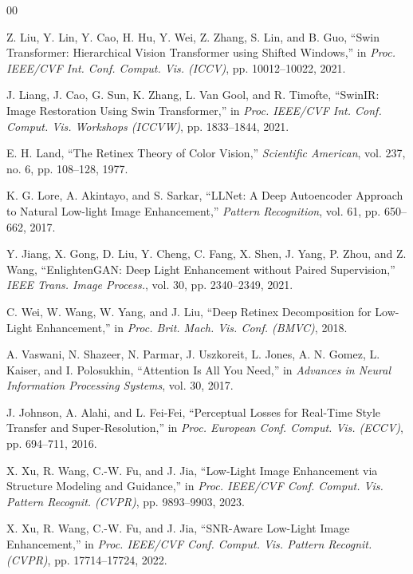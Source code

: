 \documentclass[12pt, a4paper]{report}
\begin{document}
\clearpage
\renewcommand{\bibname}{REFERENCES}
\begin{thebibliography}{00}

Z. Liu, Y. Lin, Y. Cao, H. Hu, Y. Wei, Z. Zhang, S. Lin, and B. Guo, ``Swin Transformer: Hierarchical Vision Transformer using Shifted Windows,'' in \textit{Proc. IEEE/CVF Int. Conf. Comput. Vis. (ICCV)}, pp. 10012--10022, 2021.

J. Liang, J. Cao, G. Sun, K. Zhang, L. Van Gool, and R. Timofte, ``SwinIR: Image Restoration Using Swin Transformer,'' in \textit{Proc. IEEE/CVF Int. Conf. Comput. Vis. Workshops (ICCVW)}, pp. 1833--1844, 2021.

E. H. Land, ``The Retinex Theory of Color Vision,'' \textit{Scientific American}, vol. 237, no. 6, pp. 108--128, 1977.

K. G. Lore, A. Akintayo, and S. Sarkar, ``LLNet: A Deep Autoencoder Approach to Natural Low-light Image Enhancement,'' \textit{Pattern Recognition}, vol. 61, pp. 650--662, 2017.

Y. Jiang, X. Gong, D. Liu, Y. Cheng, C. Fang, X. Shen, J. Yang, P. Zhou, and Z. Wang, ``EnlightenGAN: Deep Light Enhancement without Paired Supervision,'' \textit{IEEE Trans. Image Process.}, vol. 30, pp. 2340--2349, 2021.

C. Wei, W. Wang, W. Yang, and J. Liu, ``Deep Retinex Decomposition for Low-Light Enhancement,'' in \textit{Proc. Brit. Mach. Vis. Conf. (BMVC)}, 2018.

A. Vaswani, N. Shazeer, N. Parmar, J. Uszkoreit, L. Jones, A. N. Gomez, L. Kaiser, and I. Polosukhin, ``Attention Is All You Need,'' in \textit{Advances in Neural Information Processing Systems}, vol. 30, 2017.

J. Johnson, A. Alahi, and L. Fei-Fei, ``Perceptual Losses for Real-Time Style Transfer and Super-Resolution,'' in \textit{Proc. European Conf. Comput. Vis. (ECCV)}, pp. 694--711, 2016.

X. Xu, R. Wang, C.-W. Fu, and J. Jia, ``Low-Light Image Enhancement via Structure Modeling and Guidance,'' in \textit{Proc. IEEE/CVF Conf. Comput. Vis. Pattern Recognit. (CVPR)}, pp. 9893--9903, 2023.

X. Xu, R. Wang, C.-W. Fu, and J. Jia, ``SNR-Aware Low-Light Image Enhancement,'' in \textit{Proc. IEEE/CVF Conf. Comput. Vis. Pattern Recognit. (CVPR)}, pp. 17714--17724, 2022.


\end{thebibliography}
\end{document}
